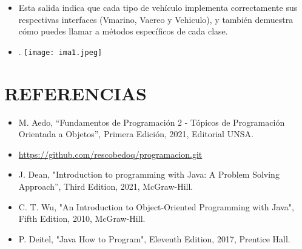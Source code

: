 \documentclass{article}
\begin{document}
\begin{itemize}
\begin{lstlisting}[language=java]
        // Pruebas individuales
        System.out.println("Barco:");
        System.out.println("------------------------");
        barco.navegar();
        barco.detenerse();
        barco.cargarMercancia();

        System.out.println("\nAvión:");
        System.out.println("------------------------");
        avion.volar();
        avion.aterrizar();
        avion.despegar();

        System.out.println("\nHidroavión:");
        System.out.println("------------------------");
        hidroavion.navegar();
        hidroavion.volar();
        hidroavion.aterrizarEnAgua();
        hidroavion.despegarDelAgua();
    }
}
        \end{lstlisting}

        \item Esta salida indica que cada tipo de vehículo implementa correctamente sus respectivas interfaces (Vmarino, Vaereo y Vehiculo), y también demuestra cómo puedes llamar a métodos específicos de cada clase.
        \centering
        \item .
        \texttt{[image: ima1.jpeg]}
        
	\end{itemize}

	\section{REFERENCIAS}
	\begin{itemize}
		\item M. Aedo, “Fundamentos de Programación 2 - Tópicos de Programación Orientada a Objetos”, Primera Edición, 2021, Editorial UNSA.
		\item \url{https://github.com/rescobedoq/programacion.git}
		\item J. Dean, "Introduction to programming with Java: A Problem Solving Approach”, Third Edition, 2021, McGraw-Hill.
        \item C. T. Wu, "An Introduction to Object-Oriented Programming with Java", Fifth Edition, 2010, McGraw-Hill.
        \item P. Deitel, "Java How to Program", Eleventh Edition, 2017, Prentice Hall.
	\end{itemize}
	
%
%
%
			
\end{document}
